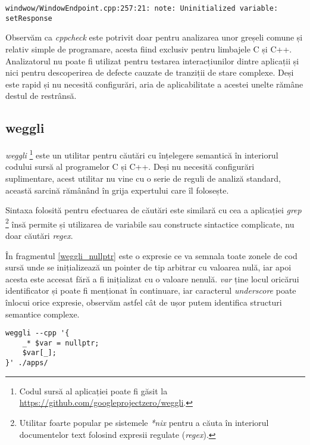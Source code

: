 \begin{lstlisting}[caption={Exemplu de fals pozitiv detectat de \textit{cppcheck}}, label={fals_pozitive_cppcheck}]
windwow/WindowEndpoint.cpp:257:21: note: Uninitialized variable: setResponse
\end{lstlisting}

Observăm ca \textit{cppcheck} este potrivit doar pentru analizarea unor greșeli comune și relativ simple de programare, acesta fiind exclusiv pentru limbajele C și C++. Analizatorul nu poate fi utilizat pentru testarea interacțiunilor dintre aplicații și nici pentru descoperirea de defecte cauzate de tranziții de stare complexe. Deși este rapid și nu necesită configurări, aria de aplicabilitate a acestei unelte rămâne destul de restrânsă.

\subsection{weggli}

\textit{weggli} \footnote{Codul sursă al aplicației poate fi găsit la \url{https://github.com/googleprojectzero/weggli}.} este un utilitar pentru căutări cu înțelegere semantică în interiorul codului sursă al programelor C și C++. Deși nu necesită configurări suplimentare, acest utilitar nu vine cu o serie de reguli de analiză standard, această sarcină rămânând în grija expertului care îl folosește.

Sintaxa folosită pentru efectuarea de căutări este similară cu cea a aplicației \textit{grep} \footnote{Utilitar foarte popular pe sistemele \textit{*nix} pentru a căuta în interiorul documentelor text folosind expresii regulate (\textit{regex}).} însă permite și utilizarea de variabile sau constructe sintactice complicate, nu doar căutări \textit{regex}.

În fragmentul \ref{weggli_nullptr} este o expresie ce va semnala toate zonele de cod sursă unde se inițializează un pointer de tip arbitrar cu valoarea nulă, iar apoi acesta este accesat fără a fi inițializat cu o valoare nenulă. \textit{var} ține locul oricărui identificator și poate fi menționat în continuare, iar caracterul \textit{underscore} poate înlocui orice expresie, observăm astfel cât de ușor putem identifica structuri semantice complexe.

\begin{lstlisting}[label={weggli_nullptr}, caption={Interogare weggli pentru a găsi accesări de pointer nul}]
weggli --cpp '{
    _* $var = nullptr;
    $var[_];
}' ./apps/
\end{lstlisting}

